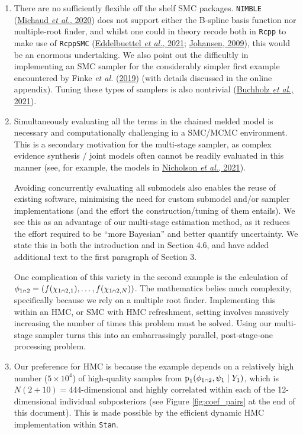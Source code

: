 \documentclass[
  10pt,
  a4paper,
]{article}
\let\Oldcap\cap
\renewcommand{\cap}{\mathrel{\mathsmaller{\Oldcap}}}
\newcommand{\pd}{\text{p}}
\begin{document}
\begin{enumerate}
\def\labelenumi{\arabic{enumi}.}
\item
  There are no sufficiently flexible off the shelf SMC packages.
  \texttt{NIMBLE}
  (\protect\hyperlink{ref-michaud_sequential_2020}{Michaud \emph{et
  al.}, 2020}) does not support either the B-spline basis function nor
  multiple-root finder, and whilst one could in theory recode both in
  \texttt{Rcpp} to make use of \texttt{RcppSMC}
  (\protect\hyperlink{ref-eddelbuettel_rcppsmc_2021}{Eddelbuettel
  \emph{et al.}, 2021};
  \protect\hyperlink{ref-johansen_smctc_2009}{Johansen, 2009}), this
  would be an enormous undertaking. We also point out the difficultly in
  implementing an SMC sampler for the considerably simpler first example
  encountered by Finke \emph{et al.}
  (\protect\hyperlink{ref-finke_efficient_2019}{2019}) (with details
  discussed in the online appendix). Tuning these types of samplers is
  also nontrivial
  (\protect\hyperlink{ref-buchholz_adaptive_2021}{Buchholz \emph{et
  al.}, 2021}).
\item
  Simultaneously evaluating all the terms in the chained melded model is
  necessary and computationally challenging in a SMC/MCMC environment.
  This is a secondary motivation for the multi-stage sampler, as complex
  evidence synthesis / joint models often cannot be readily evaluated in
  this manner (see, for example, the models in
  \protect\hyperlink{ref-nicholson_interoperability_2021}{Nicholson
  \emph{et al.}, 2021}).

  Avoiding concurrently evaluating all submodels also enables the reuse
  of existing software, minimising the need for custom submodel and/or
  sampler implementations (and the effort the construction/tuning of
  them entails). We see this as an advantage of our multi-stage
  estimation method, as it reduces the effort required to be ``more
  Bayesian'' and better quantify uncertainty. We state this in both the
  introduction and in Section 4.6, and have added additional text to the
  first paragraph of Section 3.

  One complication of this variety in the second example is the
  calculation of
  \(\phi_{1 \cap 2} = (f(\chi_{1 \cap 2, 1}), \ldots, f(\chi_{1 \cap 2, N}))\).
  The mathematics belies much complexity, specifically because we rely
  on a multiple root finder. Implementing this within an HMC, or SMC
  with HMC refreshment, setting involves massively increasing the number
  of times this problem must be solved. Using our multi-stage sampler
  turns this into an embarrassingly parallel, post-stage-one processing
  problem.
\item
  Our preference for HMC is because the example depends on a relatively
  high number (\(5 \times 10^{4}\)) of high-quality samples from
  \(\pd_{1}(\phi_{1 \cap 2}, \psi_{1} \mid Y_{1})\), which is
  \(N(2 + 10) = 444\)-dimensional and highly correlated within each of
  the 12-dimensional individual subposteriors (see Figure
  \ref{fig:coef_pairs} at the end of this document). This is made
  possible by the efficient dynamic HMC implementation within
  \texttt{Stan}.
\end{enumerate}
\end{document}
